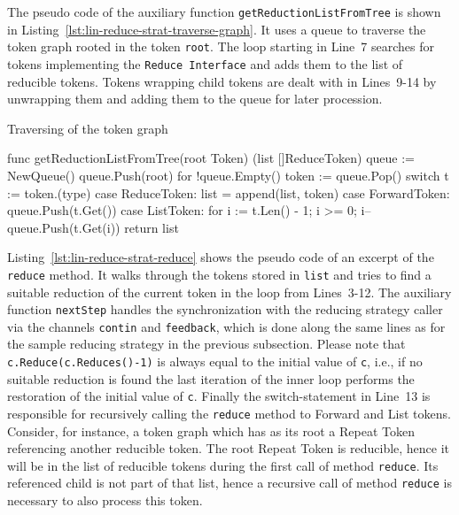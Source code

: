 The pseudo code of the auxiliary function \texttt{getReductionListFromTree} is shown in Listing~\ref{lst:lin-reduce-strat-traverse-graph}. It uses a queue to traverse the token graph rooted in the token \texttt{root}. The loop starting in Line~7 searches for tokens implementing the \texttt{Reduce Interface} and adds them to the list of reducible tokens. Tokens wrapping child tokens are dealt with in Lines~9-14 by unwrapping them and adding them to the queue for later procession.

\begin{listing}[ht]
\caption{Traversing of the token graph}
\label{lst:lin-reduce-strat-traverse-graph}
\begin{gocode}
func getReductionListFromTree(root Token) (list []ReduceToken) {
	queue := NewQueue()
	queue.Push(root)
	for !queue.Empty() {
		token := queue.Pop()
		switch t := token.(type) {
		case ReduceToken:
			list = append(list, token)
		case ForwardToken:
			queue.Push(t.Get())
		case ListToken:
			for i := t.Len() - 1; i >= 0; i-- {
				queue.Push(t.Get(i))
			}
		}
	}
	return list
}
\end{gocode}
\end{listing}

Listing~\ref{lst:lin-reduce-strat-reduce} shows the pseudo code of an excerpt of the \texttt{reduce} method. It walks through the tokens stored in \texttt{list} and tries to find a suitable reduction of the current token in the loop from Lines~3-12. The auxiliary function \texttt{nextStep} handles the synchronization with the reducing strategy caller via the channels \texttt{contin} and \texttt{feedback}, which is done along the same lines as for the sample reducing strategy in the previous subsection. Please note that \texttt{c.Reduce(c.Reduces()-1)} is always equal to the initial value of \texttt{c}, i.e., if no suitable reduction is found the last iteration of the inner loop performs the restoration of the initial value of \texttt{c}. Finally the switch-statement in Line~13 is responsible for recursively calling the \texttt{reduce} method to Forward and List tokens. Consider, for instance, a token graph which has as its root a Repeat Token referencing another reducible token. The root Repeat Token is reducible, hence it will be in the list of reducible tokens during the first call of method \texttt{reduce}. Its referenced child is not part of that list, hence a recursive call of method \texttt{reduce} is necessary to also process this token.

